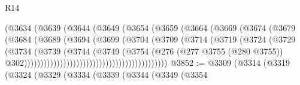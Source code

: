 \begin{lexlean}{R14}
\begin{coremodule}
                                        (@3634
                                          (@3639
                                            (@3644
                                              (@3649
                                                (@3654
                                                  (@3659
                                                    (@3664
                                                      (@3669
                                                        (@3674
                                                          (@3679
                                                            (@3684
                                                              (@3689
                                                                (@3694
                                                                  (@3699
                                                                    (@3704
                                                                      (@3709
                                                                        (@3714
                                                                          (@3719
                                                                            (@3724
                                                                              (@3729
                                                                                (@3734
                                                                                  (@3739
                                                                                    (@3744
                                                                                      (@3749
                                                                                        (@3754
                                                                                          (@276
                                                                                            (@277
                                                                                              @3755
                                                                                              (@280
                                                                                                @3755))
                                                                                            @302))))))))))))))))))))))))))))))))))))))))))))
@3852 := @3309
    (@3314
      (@3319
        (@3324
          (@3329
            (@3334
              (@3339
                (@3344
                  (@3349
                    (@3354

\end{coremodule}
\end{lexlean}
